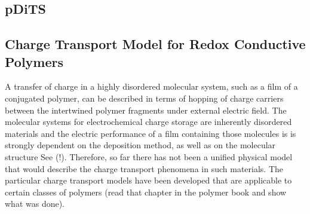 \subsection{pDiTS}


\subsection{Charge Transport Model for Redox Conductive Polymers}
A transfer of charge in a highly disordered molecular system, such as a film of a conjugated polymer, can be described in terms of hopping of charge carriers between the intertwined polymer fragments under external electric field. The molecular systems for electrochemical charge storage are inherently disordered materials and the electric performance of a film containing those molecules is is strongly dependent on the deposition method, as well as on the molecular structure See \cite{Xie2021} (!). Therefore, so far there has not been a unified physical model that would describe the charge transport phenomena in such materials. The particular charge transport models have been developed that are applicable to certain classes of polymers (read that chapter in the polymer book and show what was done). 




